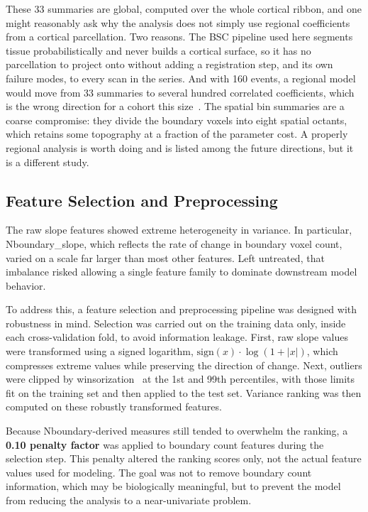 \documentclass[blue]{ludusofficial}  %
\begin{document}
These 33 summaries are global, computed over the whole cortical ribbon, and one might reasonably ask why the analysis does not simply use regional coefficients from a cortical parcellation. Two reasons. The BSC pipeline used here segments tissue probabilistically and never builds a cortical surface, so it has no parcellation to project onto without adding a registration step, and its own failure modes, to every scan in the series. And with 160 events, a regional model would move from 33 summaries to several hundred correlated coefficients, which is the wrong direction for a cohort this size~\cite{riley2019minimum}. The spatial bin summaries are a coarse compromise: they divide the boundary voxels into eight spatial octants, which retains some topography at a fraction of the parameter cost. A properly regional analysis is worth doing and is listed among the future directions, but it is a different study.

\subsection{Feature Selection and Preprocessing}

The raw slope features showed extreme heterogeneity in variance. In particular, Nboundary\_slope, which reflects the rate of change in boundary voxel count, varied on a scale far larger than most other features. Left untreated, that imbalance risked allowing a single feature family to dominate downstream model behavior.

To address this, a feature selection and preprocessing pipeline was designed with robustness in mind. Selection was carried out on the training data only, inside each cross-validation fold, to avoid information leakage. First, raw slope values were transformed using a signed logarithm, $\text{sign}(x) \cdot \log(1 + |x|)$, which compresses extreme values while preserving the direction of change. Next, outliers were clipped by winsorization~\cite{winsorization} at the 1st and 99th percentiles, with those limits fit on the training set and then applied to the test set. Variance ranking was then computed on these robustly transformed features.

Because Nboundary-derived measures still tended to overwhelm the ranking, a \textbf{0.10 penalty factor} was applied to boundary count features during the selection step. This penalty altered the ranking scores only, not the actual feature values used for modeling. The goal was not to remove boundary count information, which may be biologically meaningful, but to prevent the model from reducing the analysis to a near-univariate problem.
\end{document}
